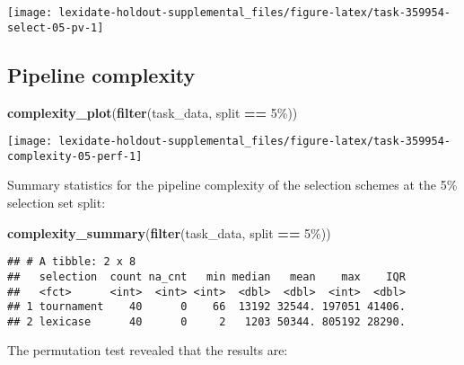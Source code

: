 \documentclass[
]{book}
\newenvironment{Shaded}{\begin{snugshade}}{\end{snugshade}}
\newcommand{\FunctionTok}[1]{\textcolor[rgb]{0.13,0.29,0.53}{\textbf{#1}}}
\newcommand{\NormalTok}[1]{#1}
\newcommand{\SpecialCharTok}[1]{\textcolor[rgb]{0.81,0.36,0.00}{\textbf{#1}}}
\newcommand{\StringTok}[1]{\textcolor[rgb]{0.31,0.60,0.02}{#1}}
\begin{document}
\texttt{[image: lexidate-holdout-supplemental\_files/figure-latex/task-359954-select-05-pv-1]}

\hypertarget{pipeline-complexity-5}{%
\subsection{Pipeline complexity}\label{pipeline-complexity-5}}

\begin{Shaded}
\begin{Highlighting}[]
\FunctionTok{complexity\_plot}\NormalTok{(}\FunctionTok{filter}\NormalTok{(task\_data, split }\SpecialCharTok{==} \StringTok{\textquotesingle{}5\%\textquotesingle{}}\NormalTok{))}
\end{Highlighting}
\end{Shaded}

\texttt{[image: lexidate-holdout-supplemental\_files/figure-latex/task-359954-complexity-05-perf-1]}

Summary statistics for the pipeline complexity of the selection schemes at the 5\% selection set split:

\begin{Shaded}
\begin{Highlighting}[]
\FunctionTok{complexity\_summary}\NormalTok{(}\FunctionTok{filter}\NormalTok{(task\_data, split }\SpecialCharTok{==} \StringTok{\textquotesingle{}5\%\textquotesingle{}}\NormalTok{))}
\end{Highlighting}
\end{Shaded}

\begin{verbatim}
## # A tibble: 2 x 8
##   selection  count na_cnt   min median   mean    max    IQR
##   <fct>      <int>  <int> <int>  <dbl>  <dbl>  <int>  <dbl>
## 1 tournament    40      0    66  13192 32544. 197051 41406.
## 2 lexicase      40      0     2   1203 50344. 805192 28290.
\end{verbatim}

The permutation test revealed that the results are:
\end{document}
